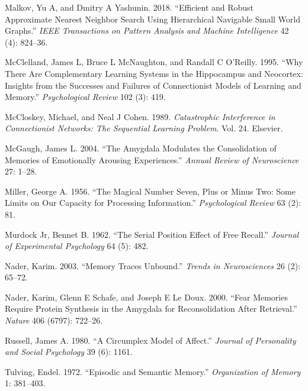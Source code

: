 \documentclass[
  letterpaper,
  DIV=11,
  numbers=noendperiod]{scrartcl}
\newlength{\cslhangindent}
\newenvironment{CSLReferences}[2] %
 {\begin{list}{}{%
  \setlength{\itemindent}{0pt}
  \setlength{\leftmargin}{0pt}
  \setlength{\parsep}{0pt}
  \ifodd #1
   \setlength{\leftmargin}{\cslhangindent}
   \setlength{\itemindent}{-1\cslhangindent}
  \fi
  \setlength{\itemsep}{#2\baselineskip}}}
 {\end{list}}
\begin{document}
\begin{CSLReferences}{1}{0}
Malkov, Yu A, and Dmitry A Yashunin. 2018. {``Efficient and Robust
Approximate Nearest Neighbor Search Using Hierarchical Navigable Small
World Graphs.''} \emph{IEEE Transactions on Pattern Analysis and Machine
Intelligence} 42 (4): 824--36.

McClelland, James L, Bruce L McNaughton, and Randall C O'Reilly. 1995.
{``Why There Are Complementary Learning Systems in the Hippocampus and
Neocortex: Insights from the Successes and Failures of Connectionist
Models of Learning and Memory.''} \emph{Psychological Review} 102 (3):
419.

McCloskey, Michael, and Neal J Cohen. 1989. \emph{Catastrophic
Interference in Connectionist Networks: The Sequential Learning
Problem}. Vol. 24. Elsevier.

McGaugh, James L. 2004. {``The Amygdala Modulates the Consolidation of
Memories of Emotionally Arousing Experiences.''} \emph{Annual Review of
Neuroscience} 27: 1--28.

Miller, George A. 1956. {``The Magical Number Seven, Plus or Minus Two:
Some Limits on Our Capacity for Processing Information.''}
\emph{Psychological Review} 63 (2): 81.

Murdock Jr, Bennet B. 1962. {``The Serial Position Effect of Free
Recall.''} \emph{Journal of Experimental Psychology} 64 (5): 482.

Nader, Karim. 2003. {``Memory Traces Unbound.''} \emph{Trends in
Neurosciences} 26 (2): 65--72.

Nader, Karim, Glenn E Schafe, and Joseph E Le Doux. 2000. {``Fear
Memories Require Protein Synthesis in the Amygdala for Reconsolidation
After Retrieval.''} \emph{Nature} 406 (6797): 722--26.

Russell, James A. 1980. {``A Circumplex Model of Affect.''}
\emph{Journal of Personality and Social Psychology} 39 (6): 1161.

Tulving, Endel. 1972. {``Episodic and Semantic Memory.''}
\emph{Organization of Memory} 1: 381--403.

\end{CSLReferences}
\end{document}

